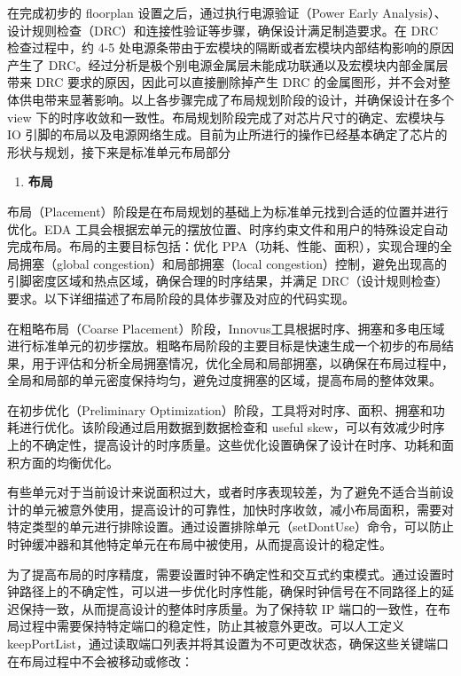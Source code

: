 在完成初步的 floorplan 设置之后，通过执行电源验证（Power Early Analysis）、设计规则检查（DRC）和连接性验证等步骤，确保设计满足制造要求。在 DRC 检查过程中，约 4-5 处电源条带由于宏模块的隔断或者宏模块内部结构影响的原因产生了 DRC。经过分析是极个别电源金属层未能成功联通以及宏模块内部金属层带来 DRC 要求的原因，因此可以直接删除掉产生 DRC 的金属图形，并不会对整体供电带来显著影响。以上各步骤完成了布局规划阶段的设计，并确保设计在多个 view 下的时序收敛和一致性。布局规划阶段完成了对芯片尺寸的确定、宏模块与 IO 引脚的布局以及电源网络生成。目前为止所进行的操作已经基本确定了芯片的形状与规划，接下来是标准单元布局部分

\begin{enumerate}
\def\labelenumi{\arabic{enumi}.}
\setcounter{enumi}{2}
\tightlist
\item
  \textbf{布局}
\end{enumerate}

布局（Placement）阶段是在布局规划的基础上为标准单元找到合适的位置并进行优化。EDA 工具会根据宏单元的摆放位置、时序约束文件和用户的特殊设定自动完成布局。布局的主要目标包括：优化 PPA（功耗、性能、面积），实现合理的全局拥塞（global congestion）和局部拥塞（local congestion）控制，避免出现高的引脚密度区域和热点区域，确保合理的时序结果，并满足 DRC（设计规则检查）要求。以下详细描述了布局阶段的具体步骤及对应的代码实现。

在粗略布局（Coarse Placement）阶段，Innovus工具根据时序、拥塞和多电压域进行标准单元的初步摆放。粗略布局阶段的主要目标是快速生成一个初步的布局结果，用于评估和分析全局拥塞情况，优化全局和局部拥塞，以确保在布局过程中，全局和局部的单元密度保持均匀，避免过度拥塞的区域，提高布局的整体效果。

在初步优化（Preliminary Optimization）阶段，工具将对时序、面积、拥塞和功耗进行优化。该阶段通过启用数据到数据检查和 useful skew，可以有效减少时序上的不确定性，提高设计的时序质量。这些优化设置确保了设计在时序、功耗和面积方面的均衡优化。

有些单元对于当前设计来说面积过大，或者时序表现较差，为了避免不适合当前设计的单元被意外使用，提高设计的可靠性，加快时序收敛，减小布局面积，需要对特定类型的单元进行排除设置。通过设置排除单元（setDontUse）命令，可以防止时钟缓冲器和其他特定单元在布局中被使用，从而提高设计的稳定性。

为了提高布局的时序精度，需要设置时钟不确定性和交互式约束模式。通过设置时钟路径上的不确定性，可以进一步优化时序性能，确保时钟信号在不同路径上的延迟保持一致，从而提高设计的整体时序质量。为了保持软 IP 端口的一致性，在布局过程中需要保持特定端口的稳定性，防止其被意外更改。可以人工定义 keepPortList，通过读取端口列表并将其设置为不可更改状态，确保这些关键端口在布局过程中不会被移动或修改：

